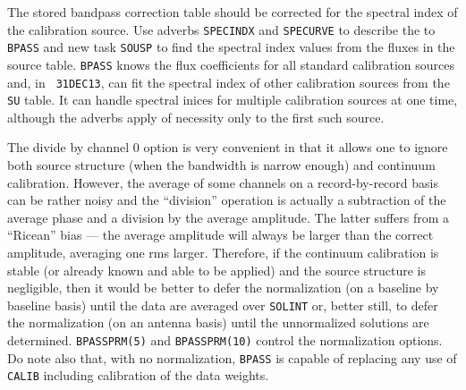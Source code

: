      The stored bandpass correction table should be corrected for the
spectral index of the calibration source.  Use adverbs {\tt SPECINDX}
and {\tt SPECURVE} to describe the  to {\tt
BPASS} and new task {\tt SOUSP} to find the spectral index values from
the fluxes in the source table.  {\tt BPASS} knows the flux
coefficients for all standard calibration sources and, in {\tt
31DEC13}, can fit the spectral index of other calibration sources from
the {\tt SU} table.  It can handle spectral inices for multiple
calibration sources at one time, although the adverbs apply of
necessity only to the first such source.

     The divide by channel 0 option is very convenient in that it
allows one to ignore both source structure (when the bandwidth is
narrow enough) and continuum calibration.  However, the average of
some channels on a record-by-record basis can be rather noisy and the
``division'' operation is actually a subtraction of the average phase
and a division by the average amplitude.  The latter suffers from a
``Ricean'' bias --- the average amplitude will always be larger than
the correct amplitude, averaging one rms larger.  Therefore, if the
continuum calibration is stable (or already known and able to be
applied) and the source structure is negligible, then it would be
better to defer the normalization (on a baseline by baseline basis)
until the data are averaged over {\tt SOLINT} or, better still, to
defer the normalization (on an antenna basis) until the unnormalized
solutions are determined.  {\tt BPASSPRM(5)} and {\tt BPASSPRM(10)}
control the normalization options.  Do note also that, with no
normalization, {\tt BPASS} is capable of replacing any use of {\tt
CALIB} including calibration of the data weights.

